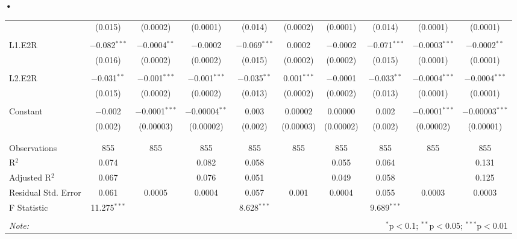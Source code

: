 \textbf{\textbf{•}}\documentclass[a4paper]{article}
\begin{document}
\begin{table}[!htbp]
{\begin{tabular}{@{\extracolsep{5pt}}lccccccccc}
  & (0.015) & (0.0002) & (0.0001) & (0.014) & (0.0002) & (0.0001) & (0.014) & (0.0001) & (0.0001) \\ 
  & & & & & & & & & \\ 
 L1.E2R & $-$0.082$^{***}$ & $-$0.0004$^{**}$ & $-$0.0002 & $-$0.069$^{***}$ & 0.0002 & $-$0.0002 & $-$0.071$^{***}$ & $-$0.0003$^{***}$ & $-$0.0002$^{**}$ \\ 
  & (0.016) & (0.0002) & (0.0002) & (0.015) & (0.0002) & (0.0002) & (0.015) & (0.0001) & (0.0001) \\ 
  & & & & & & & & & \\ 
 L2.E2R & $-$0.031$^{**}$ & $-$0.001$^{***}$ & $-$0.001$^{***}$ & $-$0.035$^{**}$ & 0.001$^{***}$ & $-$0.0001 & $-$0.033$^{**}$ & $-$0.0004$^{***}$ & $-$0.0004$^{***}$ \\ 
  & (0.015) & (0.0002) & (0.0002) & (0.013) & (0.0002) & (0.0002) & (0.013) & (0.0001) & (0.0001) \\ 
  & & & & & & & & & \\ 
 Constant & $-$0.002 & $-$0.0001$^{***}$ & $-$0.00004$^{**}$ & 0.003 & 0.00002 & 0.00000 & 0.002 & $-$0.0001$^{***}$ & $-$0.00003$^{***}$ \\ 
  & (0.002) & (0.00003) & (0.00002) & (0.002) & (0.00003) & (0.00002) & (0.002) & (0.00002) & (0.00001) \\ 
  & & & & & & & & & \\ 
\hline \\[-1.8ex] 
Observations & 855 & 855 & 855 & 855 & 855 & 855 & 855 & 855 & 855 \\ 
R$^{2}$ & 0.074 &  & 0.082 & 0.058 &  & 0.055 & 0.064 &  & 0.131 \\ 
Adjusted R$^{2}$ & 0.067 &  & 0.076 & 0.051 &  & 0.049 & 0.058 &  & 0.125 \\ 
Residual Std. Error & 0.061 & 0.0005 & 0.0004 & 0.057 & 0.001 & 0.0004 & 0.055 & 0.0003 & 0.0003 \\ 
F Statistic & 11.275$^{***}$ &  &  & 8.628$^{***}$ &  &  & 9.689$^{***}$ &  &  \\ 
\hline 
\hline \\[-1.8ex] 
\textit{Note:}  & \multicolumn{9}{r}{$^{*}$p$<$0.1; $^{**}$p$<$0.05; $^{***}$p$<$0.01} \\ 
\end{tabular} 
}
\end{table} 
\FloatBarrier
\end{document}
